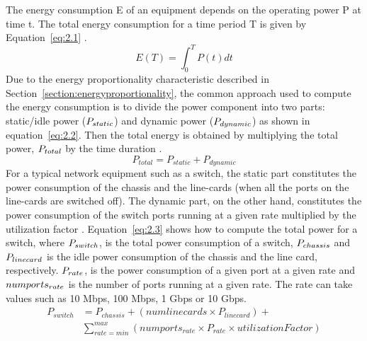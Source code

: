 The energy consumption E of an equipment depends on the operating power P at time t. The total energy consumption for a time period T is given by Equation~\ref{eq:2.1} \cite{DBLP:conf/wowmom/OrgerieLLL11}. 
\begin{equation} \label{eq:2.1}
  E(T) = \int_{0}^{T} P(t) dt
\end{equation} 
Due to the energy proportionality characteristic described in Section~\ref{section:energyproportionality}, the common approach used to compute the energy consumption is to divide the power component into two parts: static/idle power (\($$P_{static}$$\)) and dynamic power (\($$P_{dynamic}$$\)) as shown in equation~\ref{eq:2.2}. Then the total energy is obtained by multiplying the total power, \($$P_{total}$$\) by the time duration \cite{DBLP:conf/wowmom/OrgerieLLL11,DBLP:journals/tjs/KliazovichBK12,DBLP:conf/networking/MahadevanSBR09,DBLP:journals/comsur/DayarathnaWF16}. 
\begin{equation} \label{eq:2.2}
 P_{total} = P_{static} + P_{dynamic}
\end{equation} 
For a typical network equipment such as a switch, the static part constitutes the power consumption of the chassis and the line-cards (when all the ports on the line-cards are switched off). The dynamic part, on the other hand, constitutes the power consumption of the switch ports running at a given rate multiplied by the utilization factor \cite{DBLP:conf/networking/MahadevanSBR09}. Equation~\ref{eq:2.3} shows how to compute the total power for a switch, where \($$P_{switch}$$\), is the total power consumption of a switch, \($$P_{chassis}$$\) and \($$P_{linecard}$$\) is the idle power consumption of the chassis and the line card, respectively. \($$P_{rate}$$\), is the power consumption of a given port at a given rate and \($$numports_{rate}$$\) is the number of ports running at a given rate. The rate can take values such as 10 Mbps, 100 Mbps, 1 Gbps or 10 Gbps.
\begin{equation} \label{eq:2.3}
\begin{split}
P_{switch} &= P_{chassis} + (numlinecards \times P_{linecard})  + \\
&\sum_{rate=min}^{max} (numports_{rate} \times P_{rate} \times utilizationFactor)
\end{split}
\end{equation}


